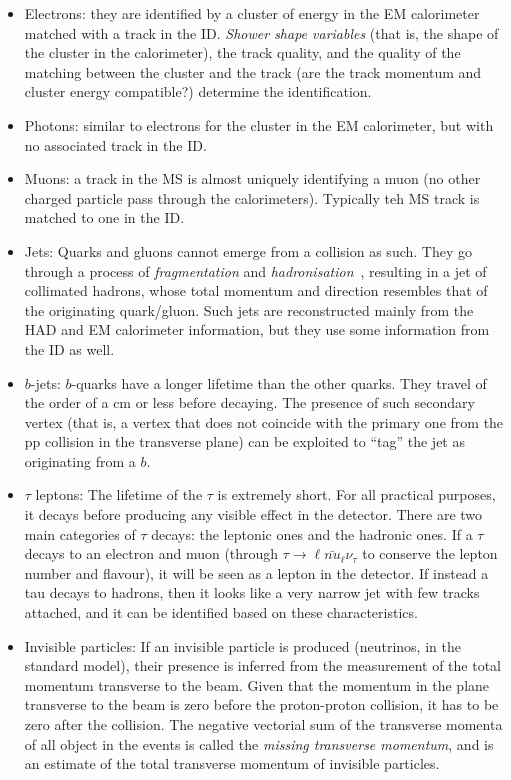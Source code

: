 \begin{itemize}
\item{Electrons:} they are identified by a cluster of energy in the EM calorimeter matched with a track in the ID. \textit{Shower shape variables} (that is, the shape of the cluster in the calorimeter), the track quality, and the quality of the matching between the cluster and the track (are the track momentum and cluster energy compatible?) determine the identification. 
\item{Photons:} similar to electrons for the cluster in the EM calorimeter, but with no associated track in the ID. 
\item{Muons:} a track in the MS is almost uniquely identifying a muon (no other charged particle pass through the calorimeters). Typically teh MS track is matched to one in the ID. 
\item{Jets:} Quarks and gluons cannot emerge from a collision as such. They go through a process of \textit{fragmentation} and \textit{hadronisation}~\cite{something}, resulting in a jet of collimated hadrons, whose total momentum and direction resembles that of the originating quark/gluon. Such jets are reconstructed mainly from the HAD and EM calorimeter information, but they use some information from the ID as well. 
\item{$b$-jets:} $b$-quarks have a longer lifetime than the other quarks. They travel of the order of a cm or less before decaying. The presence of such secondary vertex (that is, a vertex that does not coincide with the primary one from the pp collision in the transverse plane) can be exploited to ``tag'' the jet as originating from a $b$.
\item{$\tau$ leptons:} The lifetime of the $\tau$ is extremely short. For all practical purposes, it decays before producing any visible effect in the detector. There are two main categories of $\tau$ decays: the leptonic ones and the hadronic ones. If a $\tau$ decays to an electron and muon (through $\tau\rightarrow \ell \bar{nu}_{\ell} \nu_{\tau}$ to conserve the lepton number and flavour), it will be seen as a lepton in the detector. If instead a tau decays to hadrons, then it looks like a very narrow jet with few tracks attached, and it can be identified based on these characteristics. 
\item{Invisible particles:} If an invisible particle is produced (neutrinos, in the standard model), their presence is inferred from the measurement of the total momentum transverse to the beam. Given that the momentum in the plane transverse to the beam is zero before the proton-proton collision, it has to be zero after the collision. The negative vectorial sum of the transverse momenta of all object in the events is called the \textit{missing transverse momentum}, and is an estimate of the total transverse momentum of invisible particles.   
\end{itemize}

